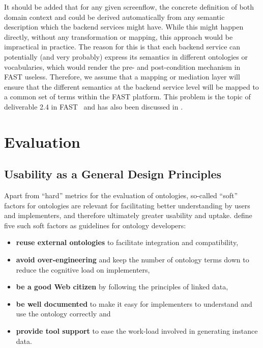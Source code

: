 \documentclass{fast_latex}
\begin{document}
It should be added that for any given screenflow, the concrete definition of both domain context and could be derived automatically from any semantic description which the backend services might have. While this might happen directly, without any transformation or mapping, this approach would be impractical in practice. The reason for this is that each backend service can potentially (and very probably) express its semantics in different ontologies or vocabularies, which would render the pre- and post-condition mechanism in FAST useless. Therefore, we assume that a mapping or mediation layer will ensure that the different semantics at the backend service level will be mapped to a common set of terms within the FAST platform. This problem is the topic of deliverable 2.4 in FAST~\cite{ambrus2010fast_mediation} and has also been discussed in \cite{Ambrus:2009it}.


\section{Evaluation} %
\label{sec:evaluation}

\subsection{Usability as a General Design Principles} %
\label{sub:general_design_decisions}

Apart from ``hard'' metrics for the evaluation of ontologies, so-called ``soft'' factors for ontologies are relevant for facilitating better understanding by users and implementers, and therefore ultimately greater usability and uptake. \cite{moeller2009ontology_soft_skills} define five such soft factors as guidelines for ontology developers:

\singlespacing
\begin{itemize}
	\item \textbf{reuse external ontologies} to facilitate integration and compatibility,
	\item \textbf{avoid over-engineering} and keep the number of ontology terms down to reduce the cognitive load on implementers,
	\item \textbf{be a good Web citizen} by following the principles of linked data,
	\item \textbf{be well documented} to make it easy for implementers to understand and use the ontology correctly and
	\item \textbf{provide tool support} to ease the work-load involved in generating instance data.
\end{itemize}
\doublespacing
\end{document}
